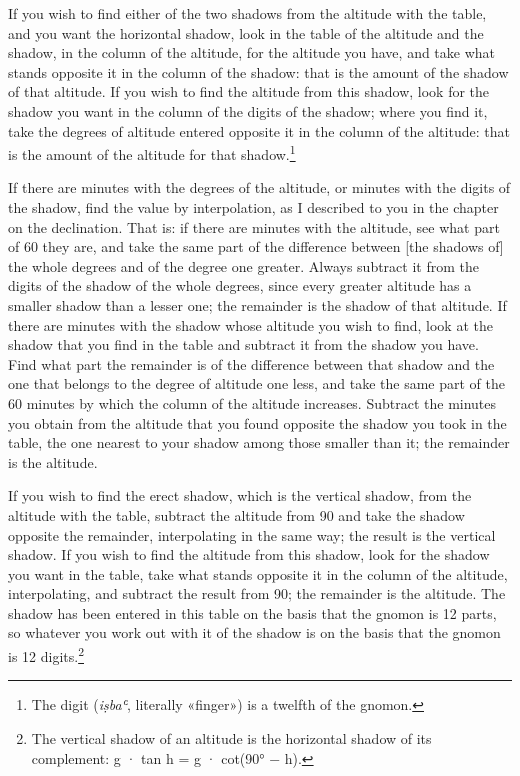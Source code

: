 \documentclass[11pt]{article}
\newcommand{\ArPage}[1]{\marginpar{\footnotesize\color{gray}Ar.\,p.\,#1}}
\begin{document}
\par \ArPage{33}If you wish to find either of the two shadows from the altitude with the table, and you want the horizontal shadow, look in the table of the altitude and the shadow, in the column of the altitude, for the altitude you have, and take what stands opposite it in the column of the shadow: that is the amount of the shadow of that altitude. If you wish to find the altitude from this shadow, look for the shadow you want in the column of the digits of the shadow; where you find it, take the degrees of altitude entered opposite it in the column of the altitude: that is the amount of the altitude for that shadow.\footnote{The digit (\emph{iṣbaʿ}, literally «finger») is a twelfth of the gnomon.}\par
\par If there are minutes with the degrees of the altitude, or minutes with the digits of the shadow, find the value by interpolation, as I described to you in the chapter on the declination. That is: if there are minutes with the altitude, see what part of 60 they are, and take the same part of the difference between [the shadows of] the whole degrees and of the degree one greater. Always subtract it from the digits of the shadow of the whole degrees, since every greater altitude has a smaller shadow than a lesser one; the remainder is the shadow of that altitude. If there are minutes with the shadow whose altitude you wish to find, look at the shadow that you find in the table and subtract it from the shadow you have. Find what part the remainder is of the difference between that shadow and the one that belongs to the degree of altitude one less, and take the same part of the 60 minutes by which the column of the altitude increases. Subtract the minutes you obtain from the altitude that you found opposite the shadow you took in the table, the one nearest to your shadow among those smaller than it; the remainder is the altitude.\par
\par If you wish to find the erect shadow, which is the vertical shadow, from the altitude with the table, subtract the altitude from 90 and take the shadow opposite the remainder, interpolating in the same way; the result is the vertical shadow. If you wish to find the altitude from this shadow, look for the shadow you want in the table, take what stands opposite it in the column of the altitude, interpolating, and subtract the result from 90; the remainder is the altitude. The shadow has been entered in this table on the basis that the gnomon is 12 parts, so whatever you work out with it of the shadow is on the basis that the gnomon is 12 digits.\footnote{The vertical shadow of an altitude is the horizontal shadow of its complement: g · tan h = g · cot(90° − h).}\par
\end{document}
